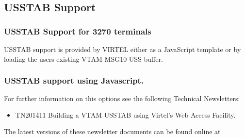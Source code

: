 \documentclass[letterpaper,10pt,english]{sphinxmanual}
\begin{document}
\sphinxAtStartPar
{}

\ignorespaces 

\subsection{USSTAB Support}
\label{\detokenize{Installation_Guide:usstab-support}}\label{\detokenize{Installation_Guide:index-24}}

\subsubsection{USSTAB Support for 3270 terminals}
\label{\detokenize{Installation_Guide:usstab-support-for-3270-terminals}}
\sphinxAtStartPar
USSTAB support is provided by VIRTEL either as a JavaScript template or by loading the users existing VTAM MSG10 USS buffer.

\ignorespaces 

\subsubsection{USSTAB support using Javascript.}
\label{\detokenize{Installation_Guide:usstab-support-using-javascript}}\label{\detokenize{Installation_Guide:index-25}}
\sphinxAtStartPar
For further information on this options see the following Technical Newsletters:\sphinxhyphen{}
\begin{itemize}
\item {} 
\sphinxAtStartPar
TN201411 Building a VTAM USSTAB using Virtel’s Web Access Facility.

\end{itemize}

\sphinxAtStartPar
The latest versions of these newsletter documents can be found online at 

\ignorespaces 
\end{document}
